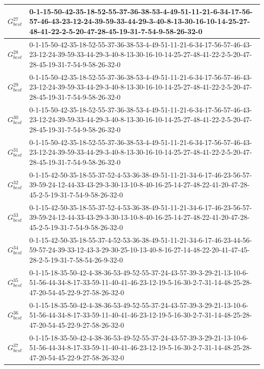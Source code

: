 \begin{landscape}
{\begin{tabularx}{\linewidth}{|c|X|}
        $G_{best}^{27}$  & 0-1-15-50-42-35-18-52-55-37-36-38-53-4-49-51-11-21-6-34-17-56-57-46-43-23-12-24-39-59-33-44-29-3-40-8-13-30-16-10-14-25-27-48-41-22-2-5-20-47-28-45-19-31-7-54-9-58-26-32-0 \\ \hline
        $G_{best}^{28}$  & 0-1-15-50-42-35-18-52-55-37-36-38-53-4-49-51-11-21-6-34-17-56-57-46-43-23-12-24-39-59-33-44-29-3-40-8-13-30-16-10-14-25-27-48-41-22-2-5-20-47-28-45-19-31-7-54-9-58-26-32-0 \\ \hline
        $G_{best}^{29}$  & 0-1-15-50-42-35-18-52-55-37-36-38-53-4-49-51-11-21-6-34-17-56-57-46-43-23-12-24-39-59-33-44-29-3-40-8-13-30-16-10-14-25-27-48-41-22-2-5-20-47-28-45-19-31-7-54-9-58-26-32-0 \\ \hline
        $G_{best}^{30}$  & 0-1-15-50-42-35-18-52-55-37-36-38-53-4-49-51-11-21-6-34-17-56-57-46-43-23-12-24-39-59-33-44-29-3-40-8-13-30-16-10-14-25-27-48-41-22-2-5-20-47-28-45-19-31-7-54-9-58-26-32-0 \\ \hline
        $G_{best}^{31}$  & 0-1-15-50-42-35-18-52-55-37-36-38-53-4-49-51-11-21-6-34-17-56-57-46-43-23-12-24-39-59-33-44-29-3-40-8-13-30-16-10-14-25-27-48-41-22-2-5-20-47-28-45-19-31-7-54-9-58-26-32-0 \\ \hline
        $G_{best}^{32}$  & 0-1-15-42-50-35-18-55-37-52-4-53-36-38-49-51-11-21-34-6-17-46-23-56-57-39-59-24-12-44-33-43-29-3-30-13-10-8-40-16-25-14-27-48-22-41-20-47-28-45-2-5-19-31-7-54-9-58-26-32-0 \\ \hline
        $G_{best}^{33}$  & 0-1-15-42-50-35-18-55-37-52-4-53-36-38-49-51-11-21-34-6-17-46-23-56-57-39-59-24-12-44-33-43-29-3-30-13-10-8-40-16-25-14-27-48-22-41-20-47-28-45-2-5-19-31-7-54-9-58-26-32-0 \\ \hline
        $G_{best}^{34}$  & 0-1-15-42-50-35-18-55-37-4-52-53-36-38-49-51-11-21-34-6-17-46-23-44-56-59-57-24-39-33-12-43-3-29-30-25-10-13-40-8-16-27-14-48-22-20-41-47-45-28-2-5-19-31-7-58-54-26-9-32-0 \\ \hline
        $G_{best}^{35}$  & 0-1-15-18-35-50-42-4-38-36-53-49-52-55-37-24-43-57-39-3-29-21-13-10-6-51-56-44-34-8-17-33-59-11-40-41-46-23-12-19-5-16-30-2-7-31-14-48-25-28-47-20-54-45-22-9-27-58-26-32-0 \\ \hline
        $G_{best}^{36}$  & 0-1-15-18-35-50-42-4-38-36-53-49-52-55-37-24-43-57-39-3-29-21-13-10-6-51-56-44-34-8-17-33-59-11-40-41-46-23-12-19-5-16-30-2-7-31-14-48-25-28-47-20-54-45-22-9-27-58-26-32-0 \\ \hline
        $G_{best}^{37}$  & 0-1-15-18-35-50-42-4-38-36-53-49-52-55-37-24-43-57-39-3-29-21-13-10-6-51-56-44-34-8-17-33-59-11-40-41-46-23-12-19-5-16-30-2-7-31-14-48-25-28-47-20-54-45-22-9-27-58-26-32-0 \\ \hline

\end{tabularx}}
\end{landscape}
